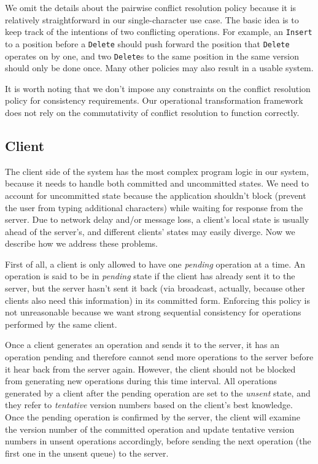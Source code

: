 We omit the details about the pairwise conflict resolution policy because it is
relatively straightforward in our single-character use case. The basic idea is
to keep track of the intentions of two conflicting operations. For example, an
{\tt Insert} to a position before a {\tt Delete} should push forward the
position that {\tt Delete} operates on by one, and two {\tt Delete}s to the same
position in the same version should only be done once. Many other policies may
also result in a usable system.

It is worth noting that we don't impose any constraints on the conflict
resolution policy for consistency requirements. Our operational transformation
framework does not rely on the commutativity of conflict resolution to function
correctly.

\subsection{Client}
\label{sec:design_client}

The client side of the system has the most complex program logic in our system,
because it needs to handle both committed and uncommitted states. We need to
account for uncommitted state because the application shouldn't block (prevent
the user from typing additional characters) while waiting for response from the
server. Due to network delay and/or message loss, a client's local state is
usually ahead of the server's, and different clients' states may easily diverge.
Now we describe how we address these problems.

First of all, a client is only allowed to have one {\em pending} operation at a
time. An operation is said to be in {\em pending} state if the client has
already sent it to the server, but the server hasn't sent it back (via
broadcast, actually, because other clients also need this information) in its
committed form. Enforcing this policy is not unreasonable because we want strong
sequential consistency for operations performed by the same client.

Once a client generates an operation and sends it to the server, it has an
operation pending and therefore cannot send more operations to the server before
it hear back from the server again. However, the client should not be blocked
from generating new operations during this time interval. All operations
generated by a client after the pending operation are set to the {\em unsent}
state, and they refer to {\em tentative} version numbers based on the client's
best knowledge. Once the pending operation is confirmed by the server, the
client will examine the version number of the committed operation and update
tentative version numbers in unsent operations accordingly, before sending the
next operation (the first one in the unsent queue) to the server.

